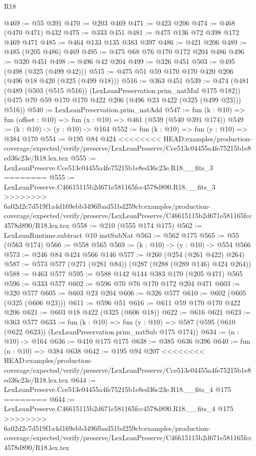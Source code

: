 \begin{lexlean}{R18}
\begin{coremodule}
{{{{{{{{{{{{{@469 := @55 @391
@470 := @203 @469
@471 := @423 @206
@474 := @468 (@470 @471) @432
@475 := @333 @451
@481 := @475 @136 @72 @398 @172 @469 @471
@485 := @464 @133 @135 @383 @397
@486 := @421 @206
@489 := @485 (@205 @486) @469
@495 := @475 @68 @76 @170 @172 @204 @486
@496 := @320 @451
@498 := @496 @42 @204
@499 := @326 @451
@503 := @495 (@498 (@325 (@499 @42)))
@515 := @475 @51 @59 @170 @170 @420 @206 (@496 @18 @420 (@325 (@499 @18)))
@516 := @363 @451
@539 := @474
    (@481
      (@489 (@503 (@515 @516)) (LexLeanPreservation.prim_natMul @175 @182))
      (@475 @70 @59 @170 @170 @422 @206 (@496 @23 @422 (@325 (@499 @23))) @516))
@540 := LexLeanPreservation.prim_natAdd
@547 := fun (k : @10) => fun (offset : @10) => fun (x : @10) => @461 (@539 (@540 @391 @174))
@549 := (k : @10) -> (y : @10) -> @164
@552 := fun (k : @10) => fun (y : @10) => @384 @170
@554 := @195 @84 @424
<<<<<<<< HEAD:examples/production-coverage/expected/verify/preserve/LexLeanPreserve/Cce513c04455a4fe75215b1e8ed36c23e/R18.lex.tex
@555 := LexLeanPreserve.Cce513c04455a4fe75215b1e8ed36c23e.R18.__fits_3
========
@555 := LexLeanPreserve.C46615115b2d671e581165fcc4578d890.R18.__fits_3
>>>>>>>> 6a02d2c7d519f1a4d169ebb3496fbad51bd259cb:examples/production-coverage/expected/verify/preserve/LexLeanPreserve/C46615115b2d671e581165fcc4578d890/R18.lex.tex
@558 := @210 (@555 @174 @175)
@562 := LexLeanRuntime.subtract @10 instSubNat
@563 := @562 @175
@565 := @55 (@563 @174)
@566 := @558 @565
@569 := (k : @10) -> (y : @10) -> @554 @566
@573 := @246 @84 @424 @566 @146
@577 := @260 (@254 (@261 @422) @264)
@587 := @573 @577 (@271 (@281 @84)) (@287 (@288 (@289 @146) @424 @264))
@588 := @463 @577
@595 := @588 @142 @144 @383 @170 (@205 @471) @565
@596 := @333 @577
@602 := @596 @70 @76 @170 @172 @204 @471
@603 := @320 @577
@605 := @603 @23 @204
@606 := @326 @577
@610 := @602 (@605 (@325 (@606 @23)))
@611 := @596 @51
@616 := @611 @59 @170 @170 @422 @206
@621 := @603 @18 @422 (@325 (@606 @18))
@622 := @616 @621
@623 := @363 @577
@633 := fun (k : @10) =>
  fun (y : @10) => @587 (@595 (@610 (@622 @623)) (LexLeanPreservation.prim_natSub @175 @174))
@634 := (n : @10) -> @164
@636 := @410 @175 @175
@638 := @385 @636 @396
@640 := fun (n : @10) => @384 @638
@642 := @195 @94 @207
<<<<<<<< HEAD:examples/production-coverage/expected/verify/preserve/LexLeanPreserve/Cce513c04455a4fe75215b1e8ed36c23e/R18.lex.tex
@644 := LexLeanPreserve.Cce513c04455a4fe75215b1e8ed36c23e.R18.__fits_4 @175
========
@644 := LexLeanPreserve.C46615115b2d671e581165fcc4578d890.R18.__fits_4 @175
>>>>>>>> 6a02d2c7d519f1a4d169ebb3496fbad51bd259cb:examples/production-coverage/expected/verify/preserve/LexLeanPreserve/C46615115b2d671e581165fcc4578d890/R18.lex.tex
}}}}}}}}}}}}}
\end{coremodule}
\end{lexlean}
